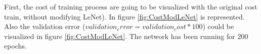
First, the cost of training process are going to be visualized with the original cost train, without modifying LeNet). In figure \ref{fig:CostModLeNet} is represented. Also the validation error ($validation_error = validation_cost*100$) could be visualized in figure \ref{fig:CostModLeNet}. The network has been running for 200 epochs.\\

\begin{figure}[htb]    \centering

\end{figure}

